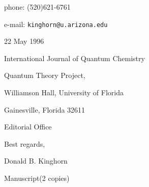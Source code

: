 \documentclass[12pt]{article}
\begin{document}
\begin{letterfrom}
\end{letterfrom}

\begin{letterfromcompany}
\end{letterfromcompany}

\begin{letterfromaddr}
\newline

phone: (520)621-6761

e-mail: \texttt{kinghorn@u.arizona.edu}
\end{letterfromaddr}

\begin{letterdate}
22 May 1996
\end{letterdate}

\begin{letterto}
International Journal of Quantum Chemistry
\end{letterto}

\begin{lettertoaddr}
Quantum Theory Project,

Williamson Hall, University of Florida

Gainesville, Florida 32611
\end{lettertoaddr}

\begin{letterattention}
Editorial Office
\end{letterattention}

\begin{lettersubj}
\end{lettersubj}

\begin{letterclosing}
Best regards,
\end{letterclosing}

\begin{lettersign}
Donald B. Kinghorn
\end{lettersign}

\begin{letterps}
\end{letterps}

\begin{letterinitials}
\end{letterinitials}

\begin{lettercc}
\end{lettercc}

\begin{letterencl}
Manuscript(2 copies)
\end{letterencl}
\end{document}

